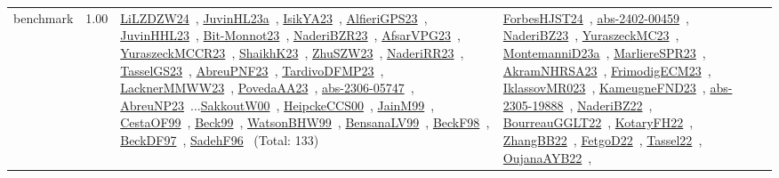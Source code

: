 {\begin{longtable}{p{3cm}r>{\raggedright\arraybackslash}p{6cm}>{\raggedright\arraybackslash}p{6cm}>{\raggedright\arraybackslash}p{8cm}}
\index{benchmark}\index{Benchmarks!benchmark}benchmark &  1.00 & \href{../works/LiLZDZW24.pdf}{LiLZDZW24}~\cite{LiLZDZW24}, \href{../works/JuvinHL23a.pdf}{JuvinHL23a}~\cite{JuvinHL23a}, \href{../works/IsikYA23.pdf}{IsikYA23}~\cite{IsikYA23}, \href{../works/AlfieriGPS23.pdf}{AlfieriGPS23}~\cite{AlfieriGPS23}, \href{../works/JuvinHHL23.pdf}{JuvinHHL23}~\cite{JuvinHHL23}, \href{../works/Bit-Monnot23.pdf}{Bit-Monnot23}~\cite{Bit-Monnot23}, \href{../works/NaderiBZR23.pdf}{NaderiBZR23}~\cite{NaderiBZR23}, \href{../works/AfsarVPG23.pdf}{AfsarVPG23}~\cite{AfsarVPG23}, \href{../works/YuraszeckMCCR23.pdf}{YuraszeckMCCR23}~\cite{YuraszeckMCCR23}, \href{../works/ShaikhK23.pdf}{ShaikhK23}~\cite{ShaikhK23}, \href{../works/ZhuSZW23.pdf}{ZhuSZW23}~\cite{ZhuSZW23}, \href{../works/NaderiRR23.pdf}{NaderiRR23}~\cite{NaderiRR23}, \href{../works/TasselGS23.pdf}{TasselGS23}~\cite{TasselGS23}, \href{../works/AbreuPNF23.pdf}{AbreuPNF23}~\cite{AbreuPNF23}, \href{../works/TardivoDFMP23.pdf}{TardivoDFMP23}~\cite{TardivoDFMP23}, \href{../works/LacknerMMWW23.pdf}{LacknerMMWW23}~\cite{LacknerMMWW23}, \href{../works/PovedaAA23.pdf}{PovedaAA23}~\cite{PovedaAA23}, \href{../works/abs-2306-05747.pdf}{abs-2306-05747}~\cite{abs-2306-05747}, \href{../works/AbreuNP23.pdf}{AbreuNP23}~\cite{AbreuNP23}...\href{../works/SakkoutW00.pdf}{SakkoutW00}~\cite{SakkoutW00}, \href{../works/HeipckeCCS00.pdf}{HeipckeCCS00}~\cite{HeipckeCCS00}, \href{../works/JainM99.pdf}{JainM99}~\cite{JainM99}, \href{../works/CestaOF99.pdf}{CestaOF99}~\cite{CestaOF99}, \href{../works/Beck99.pdf}{Beck99}~\cite{Beck99}, \href{../works/WatsonBHW99.pdf}{WatsonBHW99}~\cite{WatsonBHW99}, \href{../works/BensanaLV99.pdf}{BensanaLV99}~\cite{BensanaLV99}, \href{../works/BeckF98.pdf}{BeckF98}~\cite{BeckF98}, \href{../works/BeckDF97.pdf}{BeckDF97}~\cite{BeckDF97}, \href{../works/SadehF96.pdf}{SadehF96}~\cite{SadehF96} (Total: 133) & \href{../works/ForbesHJST24.pdf}{ForbesHJST24}~\cite{ForbesHJST24}, \href{../works/abs-2402-00459.pdf}{abs-2402-00459}~\cite{abs-2402-00459}, \href{../works/NaderiBZ23.pdf}{NaderiBZ23}~\cite{NaderiBZ23}, \href{../works/YuraszeckMC23.pdf}{YuraszeckMC23}~\cite{YuraszeckMC23}, \href{../works/MontemanniD23a.pdf}{MontemanniD23a}~\cite{MontemanniD23a}, \href{../works/MarliereSPR23.pdf}{MarliereSPR23}~\cite{MarliereSPR23}, \href{../works/AkramNHRSA23.pdf}{AkramNHRSA23}~\cite{AkramNHRSA23}, \href{../works/FrimodigECM23.pdf}{FrimodigECM23}~\cite{FrimodigECM23}, \href{../works/IklassovMR023.pdf}{IklassovMR023}~\cite{IklassovMR023}, \href{../works/KameugneFND23.pdf}{KameugneFND23}~\cite{KameugneFND23}, \href{../works/abs-2305-19888.pdf}{abs-2305-19888}~\cite{abs-2305-19888}, \href{../works/NaderiBZ22.pdf}{NaderiBZ22}~\cite{NaderiBZ22}, \href{../works/BourreauGGLT22.pdf}{BourreauGGLT22}~\cite{BourreauGGLT22}, \href{../works/KotaryFH22.pdf}{KotaryFH22}~\cite{KotaryFH22}, \href{../works/ZhangBB22.pdf}{ZhangBB22}~\cite{ZhangBB22}, \href{../works/FetgoD22.pdf}{FetgoD22}~\cite{FetgoD22}, \href{../works/Tassel22.pdf}{Tassel22}~\cite{Tassel22}, \href{../works/OujanaAYB22.pdf}{OujanaAYB22}~\cite{OujanaAYB22}, 
\end{longtable}}
